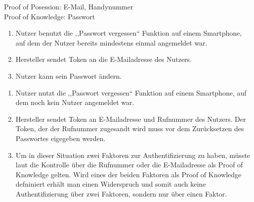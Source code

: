 \begin{itemize}[leftmargin=0cm,label={}]
                Proof of Posession: E-Mail, Handynummer\\
                Proof of Knowledge: Passwort
                \begin{enumerate}[noitemsep]
                    \item Nutzer benutzt die ,,Passwort vergessen`` Funktion auf einem Smartphone, auf dem der Nutzer bereits mindestens einmal angemeldet war.
                    \item Hersteller sendet Token an die E-Mailadresse des Nutzers.
                    \item Nutzer kann sein Passwort ändern.
                \end{enumerate}
                \begin{enumerate}[noitemsep]
                    \item Nutzer nutzt die ,,Passwort vergessen`` Funktion auf einem Smartphone, auf dem noch kein Nutzer angemeldet war.
                    \item Hersteller sendet Token an E-Mailadresse und Rufnummer des Nutzers.
                        Der Token, der der Rufnummer zugesandt wird muss vor dem Zurücksetzen des Passwortes eigegeben werden.
                    \item Um in dieser Situation zwei Faktoren zur Authentifizierung zu haben, müsste laut \cite{Jmaxxz2015} die Kontrolle über die Rufnummer oder die E-Mailadresse als Proof of Knowledge gelten.
                        Wird eines der beiden Faktoren als Proof of Knowledge defniniert erhält man einen Widerspruch und somit auch keine Authentifizierung über zwei Faktoren, sondern nur über einen Faktor.
                \end{enumerate}
        \end{itemize}
        
